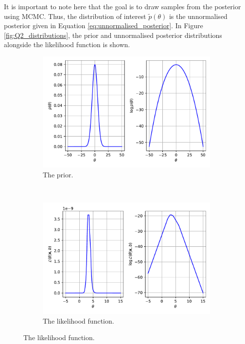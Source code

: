 \documentclass{article}
\begin{document}
	It is important to note here that the goal is to draw samples from the posterior using MCMC. Thus, the distribution of interest $\tilde{p}(\theta)$ is the unnormalised posterior given in Equation \eqref{eq:unnormalised_posterior}. In Figure \ref{fig:Q2_distributions}, the prior and unnormalised posterior distributions alongside the likelihood function is shown. 
	\begin{figure}[htb!]
		\centering
		\begin{subfigure}[b]{0.45\textwidth}
			\centering
			\includegraphics[width=\textwidth]{Q2b_1.pdf}
			\caption{The prior.}
		\end{subfigure}
		~
		\begin{subfigure}[b]{0.45\textwidth}
			\centering
			\includegraphics[width=\textwidth]{Q2b_2.pdf}
			\caption{The likelihood function.}
		\end{subfigure}
	

\end{figure}
\end{document}
